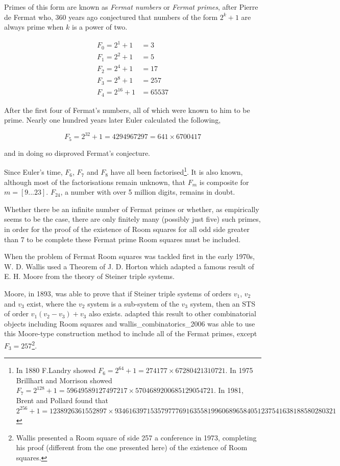 \documentclass[
  11pt,
  a4paper]{book}
\begin{document}
Primes of this form are known as \emph{Fermat numbers} or
\emph{Fermat primes}, after Pierre de Fermat who, 360 years ago
conjectured that numbers of the form \(2^k + 1\) are always
prime when \(k\) is a power of two.

\begin{align*}
  F_0 = 2^1 + 1 &= 3 \\
  F_1 = 2^2 + 1 &= 5 \\
  F_2 = 2^4 + 1 &= 17 \\
  F_3 = 2^8 + 1 &= 257 \\
  F_4 = 2^{16} + 1 &= 65537
\end{align*}

After the first four of Fermat's numbers, all of which were
known to him to be prime. Nearly one hundred years later
Euler calculated the following,

\begin{equation}
F_5 = 2^{32}+1 = 4294967297 = 641\times 6700417
\end{equation}

and in doing so disproved Fermat's conjecture.

Since Euler's time, \(F_6\), \(F_7\) and \(F_8\) have all been
factorised\footnote{In 1880 F.Landry showed
  \(F_6=2^{64}+1=274177 \times 67280421310721\). In 1975 Brillhart and
  Morrison showed
  \(F_7=2^{128}+1=59649589127497217 \times 5704689200685129054721\). In
  1981, Brent and Pollard found that\\
  \(2^{256}+1=1238926361552897 \times 93461639715357977769163558199606896584051237541638188580280321\)}. It is also known, although most of the
factorisations remain unknown, that \(F_m\) is composite for
\(m = [9...23]\). \(F_{24}\), a number with over 5 million digits,
remains in doubt.

Whether there be an infinite number of Fermat primes or
whether, as empirically seems to be the case, there are only
finitely many (possibly just five) such primes, in order for
the proof of the existence of Room squares for all odd side
greater than 7 to be complete these Fermat prime Room
squares must be included.

When the problem of Fermat Room squares was tackled first in
the early 1970s, W. D. Wallis used a Theorem of J. D. Horton
which adapted a famous result of E. H. Moore from the theory
of Steiner triple systems.

Moore, in 1893, was able to prove that if Steiner triple
systems of orders \(v_1\), \(v_2\) and \(v_3\) exist, where the
\(v_2\) system is a sub-system of the \(v_3\) system, then an
STS of order \(v_1(v_2 - v_3) + v_3\) also exists. \textcite{horton_variations_1970}
adapted this result to other combinatorial objects including
Room squares and wallis\_combinatorics\_2006 was able
to use this Moore-type construction method to include all
of the Fermat primes, except \(F_3 = 257\)\footnote{Wallis presented a Room square of side 257 a conference in 1973,
  completing his proof (different from the one presented here) of the
  existence of Room squares.}.
\end{document}
